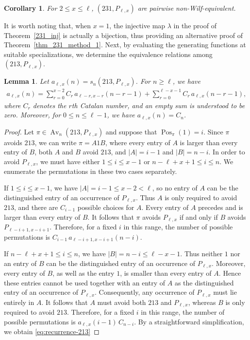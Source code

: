 \documentclass[11pt]{article}
\newtheorem{lem}[thm]{Lemma}
\newtheorem{cor}[thm]{Corollary}
\begin{document}
\begin{cor}\label{231_neq}
For $2\le x\le\ell$, $(231,P_{\ell,x})$ are pairwise non-Wilf-equivalent.
\end{cor}

It is worth noting that, when $x=1$, the injective map $\lambda$ in the proof of Theorem~\ref{231_inj} is actually
a bijection, thus providing an alternative proof of
Theorem~\ref{thm_231_method_1}. Next, by evaluating the generating functions
at suitable specializations, we determine the equivalence relations among
$(213,P_{\ell,x})$.

\begin{lem}\label{lem:recurrence-213}
Let $a_{\ell,x}(n)=s_n(213,P_{\ell,x})$.
For $n\geq\ell$, we have
\begin{align}
a_{\ell,x}(n)
={}
\sum_{r=0}^{x-2}
C_r\,a_{\ell-r,x-r}(n-r-1)
+
\sum_{r=0}^{\ell-x-1}
C_r\,a_{\ell,x}(n-r-1),
\label{eq:recurrence-213}
\end{align}
where $C_r$ denotes the $r$th Catalan number, and an empty sum is
understood to be zero. Moreover, for $0\leq n\leq\ell-1$, we have
$a_{\ell,x}(n)=C_n$.
\end{lem}

\begin{proof}
Let $\pi\in\operatorname{Av}_n(213,P_{\ell,x})$
and suppose that $\operatorname{Pos}_{\pi}(1)=i$.
Since $\pi$ avoids $213$, we can write $\pi=A1B$, where every entry of
$A$ is larger than every entry of $B$, both $A$ and $B$ avoid $213$, and
$|A|=i-1$ and $|B|=n-i$.
In order to avoid $P_{\ell,x}$, we must have either
$1\leq i\leq x-1$ or $n-\ell+x+1\leq i\leq n$.
We enumerate the permutations in these two cases separately.

If $1\leq i\leq x-1$, we have $|A|=i-1\leq x-2<\ell$,
so no entry of $A$ can be the distinguished entry of an occurrence
of $P_{\ell,x}$. Thus $A$ is only required to avoid $213$, and there
are $C_{i-1}$ possible choices for $A$.
Every entry of $A$ precedes and is larger than every entry of $B$.
It follows that $\pi$ avoids $P_{\ell,x}$ if and only if $B$ avoids
$P_{\ell-i+1,x-i+1}$.
Therefore, for a fixed $i$ in this range, the number of possible
permutations is $C_{i-1}\,
a_{\ell-i+1,x-i+1}(n-i)$.

If $n-\ell+x+1\leq i\leq n$, we have $|B|=n-i\leq\ell-x-1$.
Thus neither $1$ nor an entry of $B$ can be the distinguished entry
of an occurrence of $P_{\ell,x}$.
Moreover, every entry of $B$, as well as the entry $1$, is smaller
than every entry of $A$. Hence these entries cannot be used together
with an entry of $A$ as the distinguished entry of an occurrence of
$P_{\ell,x}$. Consequently, any occurrence of $P_{\ell,x}$ must lie
entirely in $A$.
It follows that $A$ must avoid both $213$ and $P_{\ell,x}$, whereas
$B$ is only required to avoid $213$. Therefore, for a fixed $i$ in
this range, the number of possible permutations is
$a_{\ell,x}(i-1)\,C_{n-i}$.
By a straightforward simplification, we obtain \eqref{eq:recurrence-213}
\end{proof}
\end{document}
